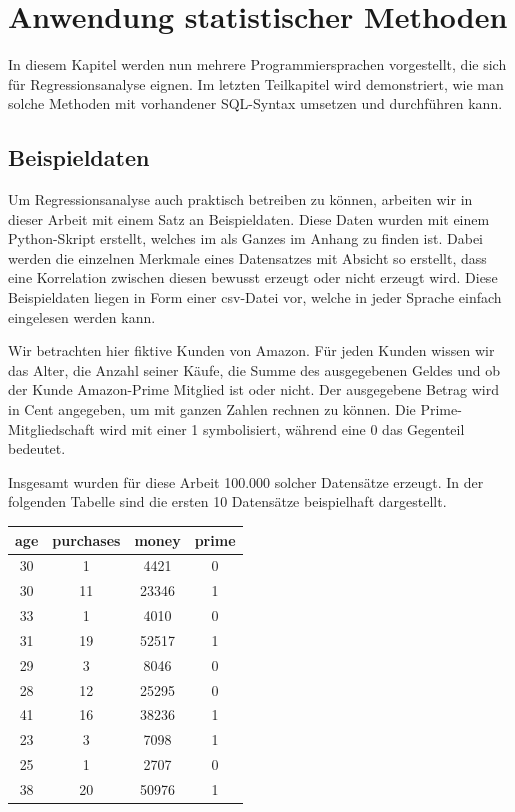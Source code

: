 \chapter{Anwendung statistischer Methoden}

In diesem Kapitel werden nun mehrere Programmiersprachen vorgestellt, die sich für Regressionsanalyse eignen. Im letzten Teilkapitel wird demonstriert, wie man solche Methoden mit vorhandener SQL-Syntax umsetzen und durchführen kann.

\section{Beispieldaten}

Um Regressionsanalyse auch praktisch betreiben zu können, arbeiten wir in dieser Arbeit mit einem Satz an Beispieldaten. Diese Daten wurden mit einem Python-Skript erstellt, welches im als Ganzes im Anhang zu finden ist. Dabei werden die einzelnen Merkmale eines Datensatzes mit Absicht so erstellt, dass eine Korrelation zwischen diesen bewusst erzeugt oder nicht erzeugt wird. Diese Beispieldaten liegen in Form einer csv-Datei vor, welche in jeder Sprache einfach eingelesen werden kann.

Wir betrachten hier fiktive Kunden von Amazon. Für jeden Kunden wissen wir das Alter, die Anzahl seiner Käufe, die Summe des ausgegebenen Geldes und ob der Kunde Amazon-Prime Mitglied ist oder nicht. Der ausgegebene Betrag wird in Cent angegeben, um mit ganzen Zahlen rechnen zu können. Die Prime-Mitgliedschaft wird mit einer 1 symbolisiert, während eine 0 das Gegenteil bedeutet.

Insgesamt wurden für diese Arbeit 100.000 solcher Datensätze erzeugt. In der folgenden Tabelle sind die ersten 10 Datensätze beispielhaft dargestellt.

\begin{center}
  \begin{tabular}{|c|c|c|c|}\hline
    \textbf{age} & \textbf{purchases} & \textbf{money} & \textbf{prime} \\ \hline
    30 & 1 & 4421 & 0 \\ \hline
    30 & 11 & 23346 & 1 \\ \hline
    33 & 1 & 4010 & 0 \\ \hline
    31 & 19 & 52517 & 1 \\ \hline
    29 & 3 & 8046 & 0 \\ \hline
    28 & 12 & 25295 & 0 \\ \hline
    41 & 16 & 38236 & 1 \\ \hline
    23 & 3 & 7098 & 1 \\ \hline
    25 & 1 & 2707 & 0 \\ \hline
    38 & 20 & 50976 & 1 \\ \hline
  \end{tabular}
\end{center}

